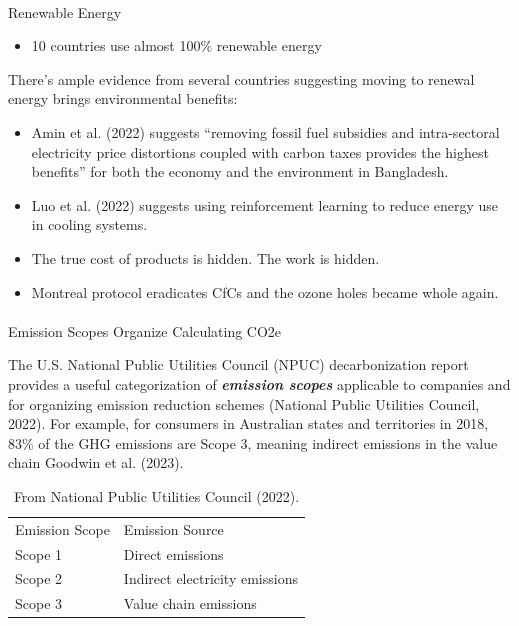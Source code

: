 \documentclass[
  letterpaper,
  DIV=11,
  numbers=noendperiod]{scrartcl}
\makeatletter
\let\oldparagraph\paragraph
\renewcommand{\paragraph}{
    \@ifstar
      \xxxParagraphStar
      \xxxParagraphNoStar
  }
\newcommand{\xxxParagraphStar}[1]{\oldparagraph*{#1}\mbox{}}
\newcommand{\xxxParagraphNoStar}[1]{\oldparagraph{#1}\mbox{}}
\providecommand{\tightlist}{%
  \setlength{\itemsep}{0pt}\setlength{\parskip}{0pt}}\usepackage{longtable,booktabs,array}
\makeatother
\begin{document}
\paragraph{Renewable Energy}\label{renewable-energy}

\begin{itemize}
\tightlist
\item
  10 countries use almost 100\% renewable energy
\end{itemize}

There's ample evidence from several countries suggesting moving to
renewal energy brings environmental benefits:

\begin{itemize}
\item
  Amin et al. (2022) suggests ``removing fossil fuel subsidies and
  intra-sectoral electricity price distortions coupled with carbon taxes
  provides the highest benefits'' for both the economy and the
  environment in Bangladesh.
\item
  Luo et al. (2022) suggests using reinforcement learning to reduce
  energy use in cooling systems.
\item
  The true cost of products is hidden. The work is hidden.
\item
  Montreal protocol eradicates CfCs and the ozone holes became whole
  again.
\end{itemize}

\paragraph{Emission Scopes Organize Calculating
CO2e}\label{emission-scopes-organize-calculating-co2e}

The U.S. National Public Utilities Council (NPUC) decarbonization report
provides a useful categorization of \textbf{\emph{emission scopes}}
applicable to companies and for organizing emission reduction schemes
(National Public Utilities Council, 2022). For example, for consumers in
Australian states and territories in 2018, 83\% of the GHG emissions are
Scope 3, meaning indirect emissions in the value chain Goodwin et al.
(2023).

\begin{longtable}[]{@{}ll@{}}
\caption{From National Public Utilities Council (2022).}\tabularnewline
\toprule\noalign{}
\endfirsthead
\endhead
\bottomrule\noalign{}
\endlastfoot
Emission Scope & Emission Source \\
Scope 1 & Direct emissions \\
Scope 2 & Indirect electricity emissions \\
Scope 3 & Value chain emissions \\
\end{longtable}
\end{document}
